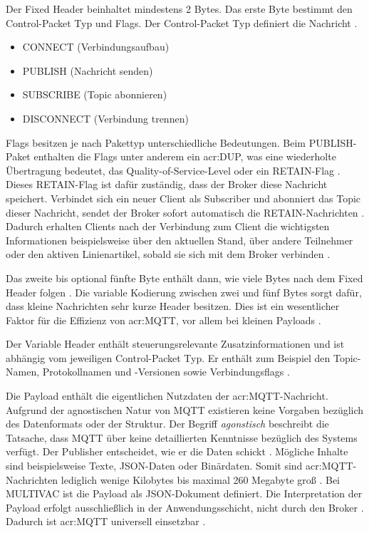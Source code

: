         Der Fixed Header beinhaltet mindestens 2 Bytes. Das erste Byte bestimmt den Control-Packet Typ und Flags.
        Der Control-Packet Typ definiert die Nachricht \autocite[30]{oasisMQTTVersion502019}.
        \begin{itemize}
            \item CONNECT (Verbindungsaufbau)
            \item PUBLISH (Nachricht senden)
            \item SUBSCRIBE (Topic abonnieren)
            \item DISCONNECT (Verbindung trennen)
        \end{itemize}
        Flags besitzen je nach Pakettyp unterschiedliche Bedeutungen. Beim PUBLISH-Paket enthalten die Flags unter anderem ein \gls{acr:DUP}, was eine wiederholte Übertragung bedeutet, das Quality-of-Service-Level oder ein RETAIN-Flag \autocite[15]{hivemqMQTTMQTT5}. Dieses RETAIN-Flag ist dafür zuständig, dass der Broker diese Nachricht speichert. Verbindet sich ein neuer Client als Subscriber und abonniert das Topic dieser Nachricht, sendet der Broker sofort automatisch die RETAIN-Nachrichten \autocite[29]{hivemqMQTTMQTT5}. Dadurch erhalten Clients nach der Verbindung zum Client die wichtigsten Informationen beispielsweise über den aktuellen Stand, über andere Teilnehmer oder den aktiven Linienartikel, sobald sie sich mit dem Broker verbinden \autocite[29]{hivemqMQTTMQTT5}.
        
        Das zweite bis optional fünfte Byte enthält dann, wie viele Bytes nach dem Fixed Header folgen \autocite[30]{oasisMQTTVersion502019}. Die variable Kodierung zwischen zwei und fünf Bytes sorgt dafür, dass kleine Nachrichten sehr kurze Header besitzen. 
        Dies ist ein wesentlicher Faktor für die Effizienz von \acrshort{acr:MQTT}, vor allem bei kleinen Payloads \autocite[124]{angewandteNetzwerktechnik}.

        Der Variable Header enthält steuerungsrelevante Zusatzinformationen und ist abhängig vom jeweiligen Control-Packet Typ.
        Er enthält zum Beispiel den Topic-Namen, Protokollnamen und -Versionen sowie Verbindungsflags \autocite[30--39]{oasisMQTTVersion502019}.

        Die Payload enthält die eigentlichen Nutzdaten der \acrshort{acr:MQTT}-Nachricht. Aufgrund der agnostischen Natur von MQTT existieren keine Vorgaben bezüglich des Datenformats oder der Struktur. Der Begriff \textit{agonstisch} beschreibt die Tatsache, dass MQTT über keine detaillierten Kenntnisse bezüglich des Systems verfügt. Der Publisher entscheidet, wie er die Daten schickt \autocite[15]{hivemqMQTTMQTT5}.
        Mögliche Inhalte sind beispielsweise Texte, JSON-Daten oder Binärdaten. Somit sind \gls{acr:MQTT}-Nachrichten lediglich wenige Kilobytes bis maximal 260 Megabyte groß \autocite[124]{angewandteNetzwerktechnik}. Bei MULTIVAC ist die Payload als JSON-Dokument definiert. Die Interpretation der Payload erfolgt ausschließlich in der Anwendungsschicht, nicht durch den Broker \autocite[15]{hivemqMQTTMQTT5}.
        Dadurch ist \acrshort{acr:MQTT} universell einsetzbar \autocite[69]{IoTMQTT}. 

